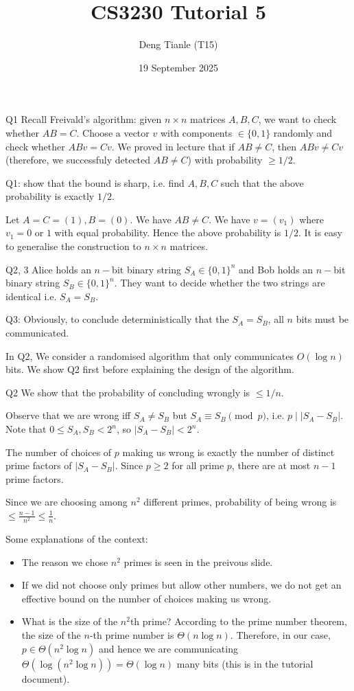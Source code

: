 \documentclass[t]{beamer}
\title{CS3230 Tutorial 5}
\author{Deng Tianle (T15)}
\date{19 September 2025}
\def\le{\leqslant}
\def\ge{\geqslant}
\begin{document}
\frame{\titlepage} 

\begin{frame}{Q1}
  Recall Freivald's algorithm: given $n \times n$ matrices $A, B, C$, we want to check whether $AB=C$. Choose a vector $v$ with components $\in \{0, 1\}$ randomly and check whether $ABv=Cv$. We proved in lecture that if $AB \ne C$, then $ABv \ne Cv$ (therefore, we successfuly detected $AB \ne C$) with probability $\ge 1/2$. 
  \par Q1: show that the bound is sharp, i.e. find $A, B, C$ such that the above probability is exactly $1/2$. 
  \pause
  \par Let $A=C=(1), B=(0)$. We have $AB \ne C$. We have $v = (v_1)$ where $v_1=0$ or $1$ with equal probability. Hence the above probability is $1/2$. It is easy to generalise the construction to $n \times n$ matrices. 
\end{frame}
\begin{frame}{Q2, 3}
  Alice holds an $n-$bit binary string $S_A \in \{0, 1\}^n$ and Bob holds an $n-$bit binary string $S_B \in \{0, 1\}^n$. They want to decide whether the two strings are identical i.e. $S_A = S_B$. 
  \par Q3: Obviously, to conclude deterministically that the $S_A = S_B$, all $n$ bits must be communicated.
  \par In Q2, We consider a randomised algorithm that only communicates $O(\log{n})$ bits. We show Q2 first before explaining the design of the algorithm. 
\end{frame}
\begin{frame}{Q2}
  We show that the probability of concluding wrongly is $\le 1/n$. 
  \par Observe that we are wrong iff $S_A \ne S_B$ but $S_A \equiv S_B \pmod{p}$, i.e. $p \mid |S_A-S_B|$. Note that $0 \le S_A, S_B < 2^n$, so $|S_A-S_B|<2^n$. 
  \par The number of choices of $p$ making us wrong is exactly the number of distinct prime factors of $|S_A-S_B|$. Since $p \ge 2$ for all prime $p$, there are at most $n-1$ prime factors. 
  \par Since we are choosing among $n^2$ different primes, probability of being wrong is $\le \frac{n-1}{n^2} \le \frac{1}{n}$.
\end{frame}
\begin{frame}
  Some explanations of the context:
  \begin{itemize}
    \item The reason we chose $n^2$ primes is seen in the preivous slide. 
    \item If we did not choose only primes but allow other numbers, we do not get an effective bound on the number of choices making us wrong.
    \item What is the size of the $n^2$th prime? According to the prime number theorem, the size of the $n$-th prime number is $\Theta(n \log{n})$. Therefore, in our case, $p \in \Theta(n^2 \log{n})$ and hence we are communicating $\Theta(\log(n^2 \log{n}))= \Theta(\log{n})$ many bits (this is in the tutorial document).
  \end{itemize}
\end{frame}
\end{document}
